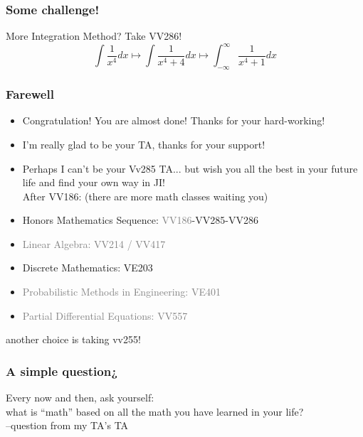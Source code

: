 \documentclass{beamer}
\begin{document}
\begin{frame}
    \frametitle{Some challenge!}
    More Integration Method? Take VV286!
    \vspace{2em}
    $$\int \frac{1}{x^4} dx \longmapsto \int \frac{1}{x^4+4}dx \longmapsto \int_{-\infty}^{\infty} \frac{1}{x^4+1} dx$$
\end{frame}

\begin{frame}
    \frametitle{Farewell}
    \begin{itemize}
        \item Congratulation! You are almost done! Thanks for your hard-working!
        \item I'm really glad to be your TA, thanks for your support! 
        \item Perhaps I can't be your Vv285 TA... but    wish you all the best in your future life 
        and find your own way in JI!
        \pause
    \vspace{1em}\\
        After VV186: (there are more math classes waiting you)
    \end{itemize}
        \begin{itemize}
        \item Honors Mathematics Sequence: \textcolor{gray}{VV186}-VV285-VV286
        \item \textcolor{gray}{Linear Algebra: VV214 / VV417}
        \item Discrete Mathematics: VE203
        \item \textcolor{gray}{Probabilistic Methods in Engineering: VE401}
        \item \textcolor{gray}{Partial Differential Equations: VV557}
    \end{itemize}
    \hspace{1em}
    \tiny{another choice is taking vv255!}
\end{frame}
\begin{frame}
    \frametitle{A simple question¿}
    \LARGE
    Every now and then, ask yourself: \\
    \vspace{1em}
    \hspace{1em}
    what is “math” based on all the math you have learned in your life?
    \\\hspace{4em}--question from my TA's TA


\end{frame}
\end{document}
